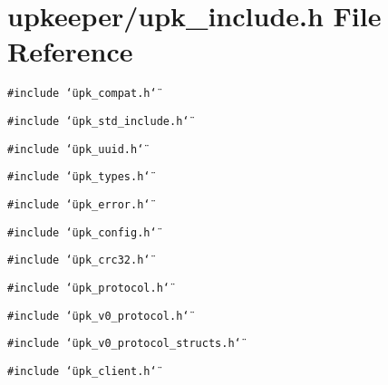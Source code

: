 \section{upkeeper/upk\_\-include.h File Reference}
\label{upk__include_8h}
{\tt \#include \char`\"{}upk\_\-compat.h\char`\"{}}\par
{\tt \#include \char`\"{}upk\_\-std\_\-include.h\char`\"{}}\par
{\tt \#include \char`\"{}upk\_\-uuid.h\char`\"{}}\par
{\tt \#include \char`\"{}upk\_\-types.h\char`\"{}}\par
{\tt \#include \char`\"{}upk\_\-error.h\char`\"{}}\par
{\tt \#include \char`\"{}upk\_\-config.h\char`\"{}}\par
{\tt \#include \char`\"{}upk\_\-crc32.h\char`\"{}}\par
{\tt \#include \char`\"{}upk\_\-protocol.h\char`\"{}}\par
{\tt \#include \char`\"{}upk\_\-v0\_\-protocol.h\char`\"{}}\par
{\tt \#include \char`\"{}upk\_\-v0\_\-protocol\_\-structs.h\char`\"{}}\par
{\tt \#include \char`\"{}upk\_\-client.h\char`\"{}}\par
